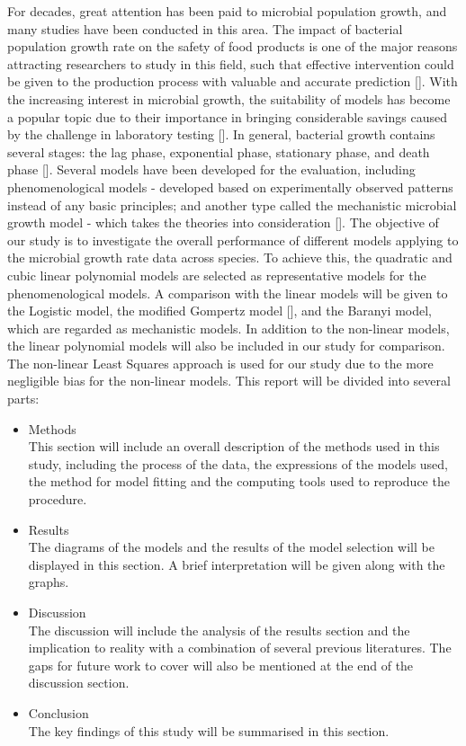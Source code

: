 \documentclass[11pt, oneside]{article}
\begin{document}
	For decades, great attention has been paid to microbial population growth, and many studies have been conducted in this area. The impact of bacterial population growth rate on the safety of food products is one of the major reasons attracting researchers to study in this field, such that effective intervention could be given to the production process with valuable and accurate prediction [\cite{nauta2002modelling}]. With the increasing interest in microbial growth, the suitability of models has become a popular topic due to their importance in bringing considerable savings caused by the challenge in laboratory testing [\cite{perni2005estimating}]. 
	\bigbreak
	\noindent In general, bacterial growth contains several stages: the lag phase, exponential phase, stationary phase, and death phase [\cite{peleg2011microbial}]. Several models have been developed for the evaluation, including phenomenological models - developed based on experimentally observed patterns instead of any basic principles; and another type called the mechanistic microbial growth model - which takes the theories into consideration [\cite{peleg2011microbial}]. The objective of our study is to investigate the overall performance of different models applying to the microbial growth rate data across species. To achieve this, the quadratic and cubic linear polynomial models are selected as representative models for the phenomenological models. A comparison with the linear models will be given to the Logistic model, the modified Gompertz model [\cite{zwietering1991modeling}], and the Baranyi model, which are regarded as mechanistic models. In addition to the non-linear models, the linear polynomial models will also be included in our study for comparison. The non-linear Least Squares approach is used for our study due to the more negligible bias for the non-linear models. 
	\bigbreak
	\noindent This report will be divided into several parts:
	\begin{itemize}
	\item Methods
	\\This section will include an overall description of the methods used in this study, including the process of the data, the expressions of the models used, the method for model fitting and the computing tools used to reproduce the procedure.
	\item Results
	\\The diagrams of the models and the results of the model selection will be displayed in this section. A brief interpretation will be given along with the graphs.
	\item Discussion
	\\The discussion will include the analysis of the results section and the implication to reality with a combination of several previous literatures. The gaps for future work to cover will also be mentioned at the end of the discussion section.
	\item Conclusion
	\\The key findings of this study will be summarised in this section.
	\end{itemize}
\end{document}
